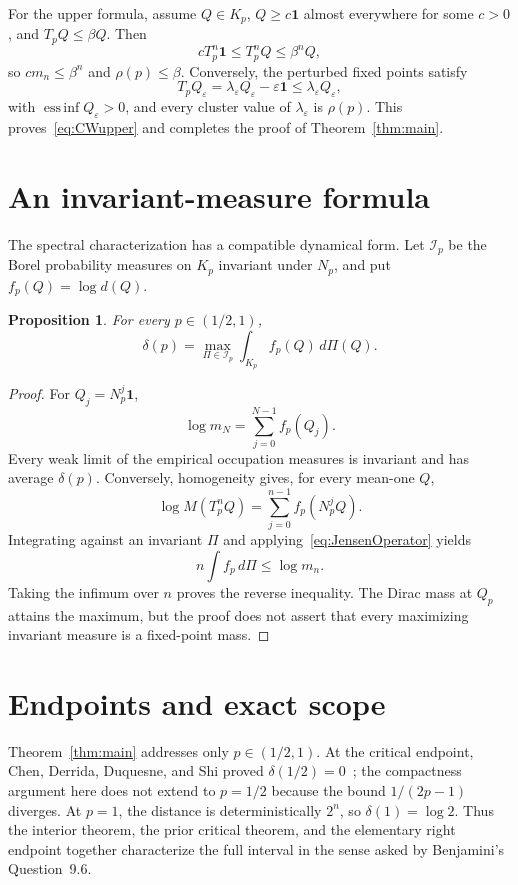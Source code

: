 \documentclass[a4paper,11pt]{amsart}
\newtheorem{proposition}[theorem]{Proposition}
\theoremstyle{remark}
\DeclareMathOperator*{\essinf}{ess\,inf}
\begin{document}
For the upper formula, assume $Q\in K_p$, $Q\ge c\mathbf1$ almost everywhere for some $c>0$, and $T_pQ\le\beta Q$. Then
\[
 cT_p^n\mathbf1\le T_p^nQ\le\beta^nQ,
\]
so $cm_n\le\beta^n$ and $\rho(p)\le\beta$. Conversely, the perturbed fixed points satisfy
\[
 T_pQ_\varepsilon=\lambda_\varepsilon Q_\varepsilon-\varepsilon\mathbf1
 \le\lambda_\varepsilon Q_\varepsilon,
\]
with $\essinf Q_\varepsilon>0$, and every cluster value of $\lambda_\varepsilon$ is $\rho(p)$. This proves~\eqref{eq:CWupper} and completes the proof of Theorem~\ref{thm:main}.

\section{An invariant-measure formula}

The spectral characterization has a compatible dynamical form. Let $\mathcal I_p$ be the Borel probability measures on $K_p$ invariant under $N_p$, and put $f_p(Q)=\log d(Q)$.

\begin{proposition}\label{prop:invariant}
For every $p\in(1/2,1)$,
\begin{equation}\label{eq:invariant}
 \delta(p)=\max_{\Pi\in\mathcal I_p}\int_{K_p}f_p(Q)\,d\Pi(Q).
\end{equation}
\end{proposition}

\begin{proof}
For $Q_j=N_p^j\mathbf1$,
\[
 \log m_N=\sum_{j=0}^{N-1}f_p(Q_j).
\]
Every weak limit of the empirical occupation measures is invariant and has average $\delta(p)$. Conversely, homogeneity gives, for every mean-one $Q$,
\[
 \log M(T_p^nQ)=\sum_{j=0}^{n-1}f_p(N_p^jQ).
\]
Integrating against an invariant $\Pi$ and applying~\eqref{eq:JensenOperator} yields
\[
 n\int f_p\,d\Pi\le\log m_n.
\]
Taking the infimum over $n$ proves the reverse inequality. The Dirac mass at $Q_p$ attains the maximum, but the proof does not assert that every maximizing invariant measure is a fixed-point mass.
\end{proof}

\section{Endpoints and exact scope}

Theorem~\ref{thm:main} addresses only $p\in(1/2,1)$. At the critical endpoint, Chen, Derrida, Duquesne, and Shi proved $\delta(1/2)=0$~\cite{ChenEtAl2026}; the compactness argument here does not extend to $p=1/2$ because the bound $1/(2p-1)$ diverges. At $p=1$, the distance is deterministically $2^n$, so $\delta(1)=\log2$. Thus the interior theorem, the prior critical theorem, and the elementary right endpoint together characterize the full interval in the sense asked by Benjamini's Question~9.6.
\end{document}
